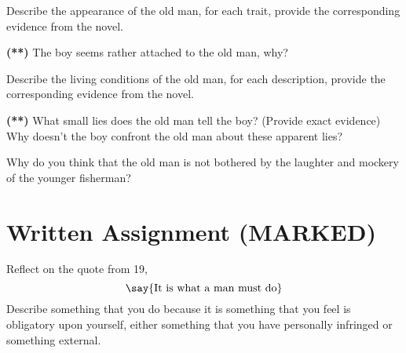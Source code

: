 \documentclass[12pt]{article} %
\begin{document}
\vspace*{4cm}

\begin{qstn}
  Describe the appearance of the old man, for each trait, provide the corresponding evidence from the novel.
\end{qstn}

\vspace*{5cm}

\begin{qstn}
  \textbf{(**)} The boy seems rather attached to the old man, why?
\end{qstn}

\newpage

\begin{qstn}
  Describe the living conditions of the old man, for each description, provide the corresponding evidence from the novel.
\end{qstn}

\vspace*{5cm}

\begin{qstn}
  \textbf{(**)} What small lies does the old man tell the boy? (Provide exact evidence) Why doesn't the boy confront the old man about these apparent
  lies?
\end{qstn}

\vspace*{5cm}

\begin{qstn}
  Why do you think that the old man is not bothered by the laughter and mockery of the younger fisherman?
\end{qstn}

\newpage

\section*{Written Assignment (MARKED)}
Reflect on the quote from 19,
\[
\say{\text{It is what a man must do}}
\] 
Describe something that you do because it is something that you feel is obligatory upon yourself, either something
that you have personally infringed or something external.
\end{document}
